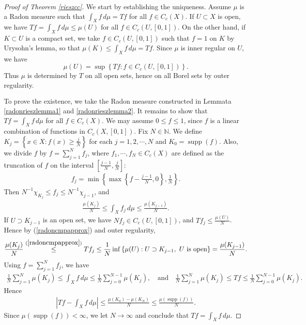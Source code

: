 \documentclass{article}
\numberwithin{equation}{section}
\newcommand{\bbN}{\mathbb{N}}
\DeclareMathOperator{\supp}{supp}
\theoremstyle{plain}
\theoremstyle{definition}
\begin{document}
\begin{proof}[Proof of Theorem \ref{rieszcc}]
	We start by establishing the uniqueness. Assume $\mu$ is a Radon measure such that $\int_X f\,d\mu=Tf$ for all $f\in C_c(X)$. If $U\subset X$ is open, we have $Tf=\int_X f\,d\mu\leq\mu(U)$ for all $f\in C_c(U,[0,1])$. On the other hand, if $K\subset U$ is a compact set, we take $f\in C_c(U,[0,1])$ such that $f=1$ on $K$ by Urysohn's lemma, so that $\mu(K)\leq \int_X f\,d\mu=Tf$. Since $\mu$ is inner regular on $U$, we have $$\mu(U)=\sup\left\{Tf:f\in C_c(U,[0,1])\right\}.$$ Thus $\mu$ is determined by $T$ on all open sets, hence on all Borel sets by outer regularity.
	
	To prove the existence, we take the Radon measure constructed in Lemmata \ref{radonrieszlemma1} and \ref{radonrieszlemma2}. It remains to show that $Tf=\int_X f\,d\mu$ for all $f\in C_c(X)$. We may assume $0\leq f\leq 1$, since $f$ is a linear combination of functions in $C_c(X,[0,1])$. Fix $N\in\bbN$. We define $K_j=\left\{x\in X:f(x)\geq\frac{j}{N}\right\}$ for each $j=1,2,\cdots,N$ and $K_0=\supp(f)$. Also, we divide $f$ by $f=\sum_{j=1}^Nf_j$, where $f_1,\cdots,f_N\in C_c(X)$ are defined as the truncation of $f$ on the interval $\left[\frac{j-1}{N},\frac{j}{N}\right]$:\vspace{-0.1cm}
	\begin{align*}
		f_j=\min\left\{\max\left\{f-\frac{j-1}{N},0\right\},\frac{1}{N}\right\}.
	\end{align*}
	Then $N^{-1}\chi_{K_j}\leq f_j\leq N^{-1}\chi_{j-1}$, and\vspace{-0.1cm}
	\begin{align*}
		\frac{\mu(K_j)}{N}\leq \int_X f_j\,d\mu\leq\frac{\mu(K_{j-1})}{N}.
	\end{align*}
	If $U\supset K_{j-1}$ is an open set, we have $Nf_j\in C_c(U,[0,1])$, and
	$Tf_j\leq\frac{\mu(U)}{N}$. Hence by (\ref{radoncmpapprox}) and outer regularity,\vspace{-0.1cm}
	\begin{align*}
		\frac{\mu(K_j)}{N}\overset{(\ref{radoncmpapprox})}{\leq} Tf_j\leq\frac{1}{N}\inf\left\{\mu(U):U\supset K_{j-1},\ U\ \text{is open}\right\}=\frac{\mu(K_{j-1})}{N}.
	\end{align*}
	Using $f=\sum_{j=1}^Nf_j$, we have\vspace{-0.1cm}
	\begin{align*}
		\frac{1}{N}\sum_{j=1}^N\mu(K_j)\leq \int_X f\,d\mu\leq \frac{1}{N}\sum_{j=0}^{N-1}\mu(K_j),\quad\text{and}\quad \frac{1}{N}\sum_{j=1}^N\mu(K_j)\leq Tf\leq \frac{1}{N}\sum_{j=0}^{N-1}\mu(K_j).
	\end{align*}
	Hence\vspace{-0.1cm}
	\begin{align*}
		\left\vert Tf-\int_X f\,d\mu\right\vert\leq\frac{\mu(K_0)-\mu(K_N)}{N}\leq\frac{\mu(\supp(f))}{N}.
	\end{align*}
	Since $\mu(\supp(f))<\infty$, we let $N\to\infty$ and conclude that $Tf=\int_X f\,d\mu$.
\end{proof}
\end{document}
